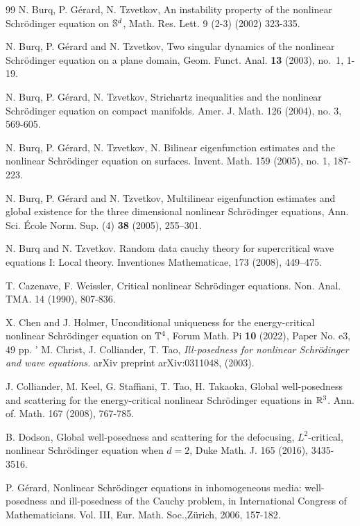 \documentclass[11pt, reqno]{amsart}
\numberwithin{equation}{section}
\theoremstyle{definition}
\theoremstyle{remark}
\begin{document}
{\begin{thebibliography}{99}
 N. Burq, P. G\'{e}rard, N. Tzvetkov, An instability property of the nonlinear Schr\"{o}dinger equation on $\Bbb S^d$, Math. Res. Lett. 9 (2-3) (2002) 323-335.

 N. Burq, P. G\'erard and N. Tzvetkov, Two singular dynamics of the nonlinear Schr\"odinger equation on a plane domain, Geom. Funct. Anal. {\bf 13} (2003), no.~1, 1-19.
			
 N. Burq, P. G\'{e}rard, N. Tzvetkov, Strichartz inequalities and the nonlinear Schr\"{o}dinger equation on compact manifolds. Amer. J. Math. 126 (2004), no. 3, 569-605. 			
			
 N. Burq, P. G\'{e}rard, N. Tzvetkov, N. Bilinear eigenfunction estimates and the nonlinear Schr\"{o}dinger equation on surfaces. Invent. Math. 159 (2005), no. 1, 187-223.
			
 N. Burq, P. G\'erard and N. Tzvetkov, Multilinear eigenfunction estimates and global existence for the three dimensional nonlinear Schr\"odinger equations, Ann. Sci. \'Ecole Norm. Sup. (4) {\bf 38} (2005), 255--301.
    
N. Burq and N. Tzvetkov. Random data cauchy theory for supercritical wave equations I: Local theory. Inventiones Mathematicae, 173 (2008), 449--475.
			
 T. Cazenave, F. Weissler, Critical nonlinear Schr\"{o}dinger equations. Non. Anal. TMA. 14 (1990), 807-836.

 X. Chen and J. Holmer, Unconditional uniqueness for the energy-critical nonlinear Schr\"odinger equation on $\Bbb T^4$, Forum Math. Pi {\bf 10} (2022), Paper No. e3, 49 pp.
			'
 M. Christ, J. Colliander, T. Tao, \emph{Ill-posedness for nonlinear Schr\"odinger and wave equations.} arXiv preprint arXiv:0311048, (2003).
			
 J. Colliander, M. Keel, G. Staffiani, T. Tao, H. Takaoka, Global well-posedness and scattering for the energy-critical nonlinear Schr\"{o}dinger equations in $\Bbb{R}^3$. Ann. of. Math. 167 (2008), 767-785.

 B. Dodson, Global well-posedness and scattering for the defocusing,  $L^2$-critical, nonlinear Schr\"odinger equation when $d=2$, Duke Math. J. 165 (2016), 3435-3516.

 P. G\'{e}rard, Nonlinear Schr\"odinger equations in inhomogeneous media: well-posedness and ill-posedness of the Cauchy problem, in International Congress of Mathematicians. Vol. III, Eur. Math. Soc.,Z\"urich, 2006, 157-182.
			

\end{thebibliography}}
\end{document}
